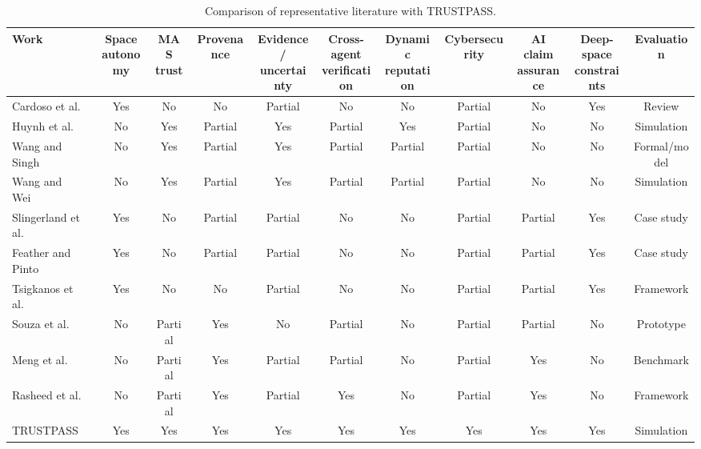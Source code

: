 \documentclass[10pt,conference]{IEEEtran}
\begin{document}
\begin{table}[t]
\centering
\caption{Comparison of representative literature with TRUSTPASS.}
\label{tab:related-comparison}
\scriptsize
\setlength{\tabcolsep}{2pt}
\renewcommand{\arraystretch}{0.9}
\begin{tabular}{p{2.5cm}cccccccccc}
\toprule
Work & \shortstack{Space\\autonomy} & \shortstack{MAS\\trust} & Provenance &
\shortstack{Evidence/\\uncertainty} & \shortstack{Cross-agent\\verification} &
\shortstack{Dynamic\\reputation} & Cybersecurity &
\shortstack{AI claim\\assurance} & \shortstack{Deep-space\\constraints} & Evaluation \\
\midrule
Cardoso et al.~\cite{cardoso2021review}
& Yes & No & No & Partial & No & No & Partial & No & Yes & Review \\

Huynh et al.~\cite{huynh2006integrated}
& No & Yes & Partial & Yes & Partial & Yes & Partial & No & No & Simulation \\

Wang and Singh~\cite{wang2010evidence}
& No & Yes & Partial & Yes & Partial & Partial & Partial & No & No & Formal/model \\

Wang and Wei~\cite{wang2022adaptive}
& No & Yes & Partial & Yes & Partial & Partial & Partial & No & No & Simulation \\

Slingerland et al.~\cite{slingerland2022adapting}
& Yes & No & Partial & Partial & No & No & Partial & Partial & Yes & Case study \\

Feather and Pinto~\cite{feather2023assurance}
& Yes & No & Partial & Partial & No & No & Partial & Partial & Yes & Case study \\

Tsigkanos et al.~\cite{tsigkanos2025verification}
& Yes & No & No & Partial & No & No & Partial & Partial & Yes & Framework \\

Souza et al.~\cite{souza2025provagent}
& No & Partial & Yes & No & Partial & No & Partial & Partial & No & Prototype \\

Meng et al.~\cite{meng2026scientistone}
& No & Partial & Yes & Partial & Partial & No & Partial & Yes & No & Benchmark \\

Rasheed et al.~\cite{rasheed2026fluent}
& No & Partial & Yes & Partial & Yes & No & Partial & Yes & No & Framework \\

TRUSTPASS
& Yes & Yes & Yes & Yes & Yes & Yes & Yes & Yes & Yes & Simulation \\
\bottomrule
\end{tabular}
\end{table}
\end{document}

